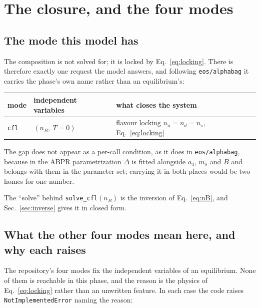 \documentclass[aps,prc,onecolumn,superscriptaddress,nofootinbib,10pt]{revtex4-2}
\newcommand{\nB}{n_B}
\newcommand{\ms}{m_s}
\begin{document}
\section{The closure, and the four modes}
\label{sec:modes}

\subsection{The mode this model has}

The composition is not solved for; it is locked by Eq.~\eqref{eq:locking}.
There is therefore exactly one request the model answers, and following
\texttt{eos/alphabag} it carries the phase's own name rather than an
equilibrium's:
%
\begin{center}
\begin{tabular}{lll}
\toprule
mode & independent variables & what closes the system \\
\midrule
\texttt{cfl} & $(\nB,\ T = 0)$ & flavour locking $n_u = n_d = n_s$,
                                 Eq.~\eqref{eq:locking} \\
\bottomrule
\end{tabular}
\end{center}
%
The gap does not appear as a per-call condition, as it does in
\texttt{eos/alphabag}, because in the ABPR parametrization $\Delta$ is fitted
alongside $a_4$, $\ms$ and $B$ and belongs with them in the parameter set;
carrying it in both places would be two homes for one number.

The ``solve'' behind \texttt{solve\_cfl}$(\nB)$ is the inversion of
Eq.~\eqref{eq:nB}, and Sec.~\ref{sec:inverse} gives it in closed form.

\subsection{What the other four modes mean here, and why each raises}

The repository's four modes fix the independent variables of an equilibrium.
None of them is reachable in this phase, and the reason is the physics of
Eq.~\eqref{eq:locking} rather than an unwritten feature. In each case the code
raises \texttt{NotImplementedError} naming the reason:
\end{document}
